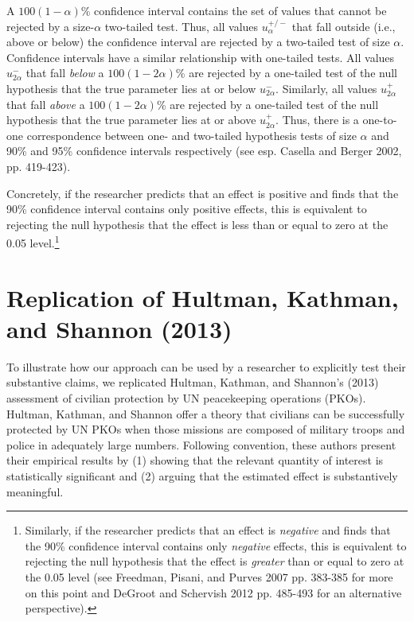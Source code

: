 \documentclass[12pt]{article}
\begin{document}
A $100(1-\alpha)$\% confidence interval contains the set of values that cannot be rejected by a size-$\alpha$ two-tailed test. Thus, all values $u^{+/-}_{\alpha}$ that fall outside (i.e., above or below) the confidence interval are rejected by a two-tailed test of size $\alpha$. Confidence intervals have a similar relationship with one-tailed tests. All values $u^{-}_{2\alpha}$ that fall \textit{below} a $100(1-2\alpha)$\% are rejected by a one-tailed test of the null hypothesis that the true parameter lies at or below $u^{-}_{2\alpha}$. Similarly, all values $u^{+}_{2\alpha}$ that fall \textit{above} a $100(1-2\alpha)$\% are rejected by a one-tailed test of the null hypothesis that the true parameter lies at or above $u^{+}_{2\alpha}$. Thus, there is a one-to-one correspondence between one- and two-tailed hypothesis tests of size $\alpha$ and 90\% and 95\% confidence intervals respectively (see esp. Casella and Berger 2002, pp. 419-423).

Concretely, if the researcher predicts that an effect is positive and finds that the 90\% confidence interval contains only positive effects, this is equivalent to rejecting the null hypothesis that the effect is less than or equal to zero at the 0.05 level.\footnote{Similarly, if the researcher predicts that an effect is \textit{negative} and finds that the 90\% confidence interval contains only \textit{negative} effects, this is equivalent to rejecting the null hypothesis that the effect is \textit{greater} than or equal to zero at the 0.05 level (see Freedman, Pisani, and Purves 2007 pp. 383-385 for more on this point and DeGroot and Schervish 2012 pp. 485-493 for an alternative perspective).}

\section*{Replication of Hultman, Kathman, and Shannon (2013)}

To illustrate how our approach can be used by a researcher to explicitly test their substantive claims, we replicated Hultman, Kathman, and Shannon's (2013) assessment of civilian protection by UN peacekeeping operations (PKOs). Hultman, Kathman, and Shannon offer a theory that civilians can be successfully protected by UN PKOs when those missions are composed of military troops and police in adequately large numbers. Following convention, these authors present their empirical results by (1) showing that the relevant quantity of interest is statistically significant and (2) arguing that the estimated effect is substantively meaningful.
\end{document}
